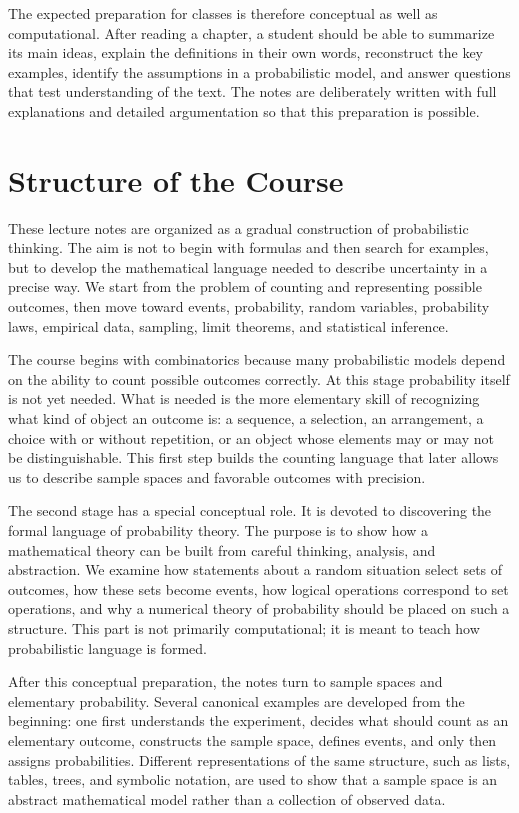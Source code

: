 The expected preparation for classes is therefore conceptual as well as computational. After reading a chapter, a student should be able to summarize its main ideas, explain the definitions in their own words, reconstruct the key examples, identify the assumptions in a probabilistic model, and answer questions that test understanding of the text. The notes are deliberately written with full explanations and detailed argumentation so that this preparation is possible.

\section{Structure of the Course}

These lecture notes are organized as a gradual construction of probabilistic thinking. The aim is not to begin with formulas and then search for examples, but to develop the mathematical language needed to describe uncertainty in a precise way. We start from the problem of counting and representing possible outcomes, then move toward events, probability, random variables, probability laws, empirical data, sampling, limit theorems, and statistical inference.

The course begins with combinatorics because many probabilistic models depend on the ability to count possible outcomes correctly. At this stage probability itself is not yet needed. What is needed is the more elementary skill of recognizing what kind of object an outcome is: a sequence, a selection, an arrangement, a choice with or without repetition, or an object whose elements may or may not be distinguishable. This first step builds the counting language that later allows us to describe sample spaces and favorable outcomes with precision.

The second stage has a special conceptual role. It is devoted to discovering the formal language of probability theory. The purpose is to show how a mathematical theory can be built from careful thinking, analysis, and abstraction. We examine how statements about a random situation select sets of outcomes, how these sets become events, how logical operations correspond to set operations, and why a numerical theory of probability should be placed on such a structure. This part is not primarily computational; it is meant to teach how probabilistic language is formed.

After this conceptual preparation, the notes turn to sample spaces and elementary probability. Several canonical examples are developed from the beginning: one first understands the experiment, decides what should count as an elementary outcome, constructs the sample space, defines events, and only then assigns probabilities. Different representations of the same structure, such as lists, tables, trees, and symbolic notation, are used to show that a sample space is an abstract mathematical model rather than a collection of observed data.

